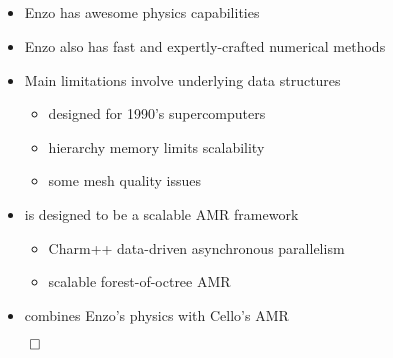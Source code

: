 \NEWSEC

\subsection{\ssIntroSummary}


\begin{frame}[fragile,label=ss-intro-summary] 
\secframetitle{\ssIntroSummary}

\begin{itemize}
\item Enzo has awesome physics capabilities
\item Enzo also has fast and expertly-crafted numerical methods
\item Main limitations involve underlying data structures
  \begin{itemize}
  \item designed for 1990's supercomputers
  \item hierarchy memory limits scalability
  \item some mesh quality issues
  \end{itemize}
\item {} is designed to be a scalable AMR framework
  \begin{itemize}
  \item Charm++ data-driven asynchronous parallelism
  \item scalable forest-of-octree AMR
  \end{itemize}
\item {} combines Enzo's physics with Cello's AMR
\end{itemize}
\vfill
\centerline{$\qed$}
\end{frame}

